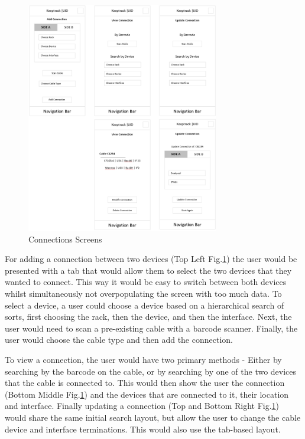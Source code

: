 \documentclass [11pt,a4paper]{article}
\begin{document}
\begin{figure}[H]
    \centering
    \includegraphics[width=0.75\textwidth]{images/initial_prototype_connections.png}
    \caption{Connections Screens}
    \label{fig:low_fidelity_prototypes_connections}
\end{figure}

For adding a connection between two devices (Top Left Fig.\ref{fig:low_fidelity_prototypes_connections}) the user would be presented with a tab that would allow them to select the two devices that they wanted to connect. This way it would be easy to switch between both devices whilst simultaneously not overpopulating the screen with too much data. To select a device, a user could choose a device based on a hierarchical search of sorts, first choosing the rack, then the device, and then the interface. Next, the user would need to scan a pre-existing cable with a barcode scanner. Finally, the user would choose the cable type and then add the connection. 

To view a connection, the user would have two primary methods - Either by searching by the barcode on the cable, or by searching by one of the two devices that the cable is connected to. This would then show the user the connection (Bottom Middle Fig.\ref{fig:low_fidelity_prototypes_connections}) and the devices that are connected to it, their location and interface. Finally updating a connection (Top and Bottom Right Fig.\ref{fig:low_fidelity_prototypes_connections}) would share the same initial search layout, but allow the user to change the cable device and interface terminations. This would also use the tab-based layout. 
\end{document}
